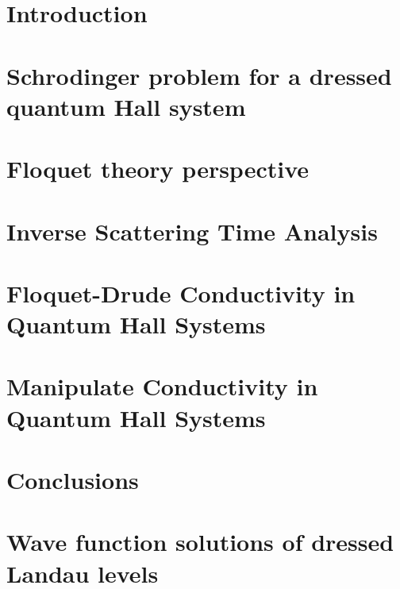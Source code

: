\documentclass[%
 reprint,
 amsmath,amssymb,
 aps,
prb,
]{revtex4-2}
\begin{document}
\section{\label{sec_introduction} Introduction}


\section{\label{sec_schrodinger_problem} Schrodinger problem for a dressed quantum Hall system}


\section{\label{sec_floquet_theory} Floquet theory perspective}


\section{\label{sec_inverse_scattering_time}  Inverse Scattering Time Analysis}


\section{\label{sec_floquet_drude_conductivity} Floquet-Drude Conductivity in Quantum Hall Systems}


\section{\label{sec_manipulate_conductivity} Manipulate Conductivity in Quantum Hall Systems}


\section{\label{sec_conclusions} Conclusions}


\begin{acknowledgments}

\end{acknowledgments}

\appendix

\section{\label{appendix_a} Wave function solutions of dressed Landau levels}

\end{document}
